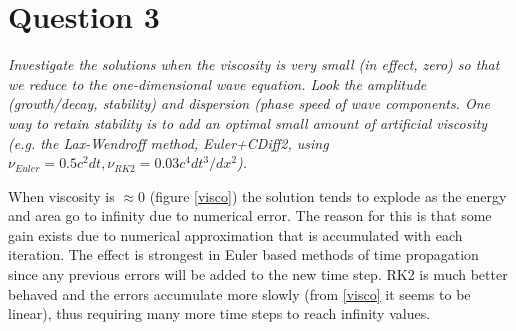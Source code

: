 \section*{Question 3}
\emph{Investigate the solutions when the viscosity is very small (in effect, zero) so that we reduce to the one-dimensional wave equation. Look the amplitude (growth/decay, stability) and dispersion (phase speed of wave components. One way to retain stability is to add an optimal small amount of artificial viscosity (e.g. the Lax-Wendroff method, Euler+CDiff2, using $\nu_{Euler} = 0.5 c^2 dt, \nu_{RK2} = 0.03 c^4 dt^3/dx^2$).}

When viscosity is $\approx 0$ (figure \ref{visco}) the solution tends to explode as the energy and area go to infinity due to numerical error. The reason for this is that some gain exists due to numerical approximation that is accumulated with each iteration. The effect is strongest in Euler based methods of time propagation since any previous errors will be added to the new time step. RK2 is much better behaved and the errors accumulate more slowly (from \ref{visco} it seems to be linear), thus requiring many more time steps to reach infinity values.

